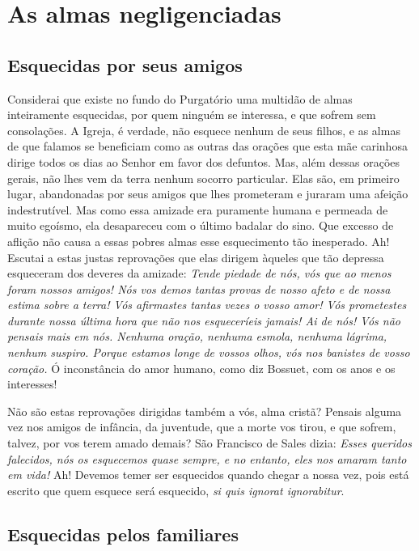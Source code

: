 \renewcommand{\thechapterdisplay}{Décimo terceiro dia}
\renewcommand{\thechapterrunner}{As almas negligenciadas}
\chapter[Décimo terceiro dia --- As almas negligenciadas]{As almas negligenciadas}
\section*{Esquecidas por seus amigos}

Considerai que existe no fundo do Purgatório uma multidão de almas inteiramente esquecidas, por quem ninguém se interessa, e que sofrem sem consolações. A Igreja, é verdade, não esquece nenhum de seus filhos, e as almas de que falamos se beneficiam como as outras das orações que esta mãe carinhosa dirige todos os dias ao Senhor em favor dos defuntos. Mas, além dessas orações gerais, não lhes vem da terra nenhum socorro particular. Elas são, em primeiro lugar, abandonadas por seus amigos que lhes prometeram e juraram uma afeição indestrutível. Mas como essa amizade era puramente humana e permeada de muito egoísmo, ela desapareceu com o último badalar do sino. Que excesso de aflição não causa a essas pobres almas esse esquecimento tão inesperado. Ah! Escutai a estas justas reprovações que elas dirigem àqueles que tão depressa esqueceram dos deveres da amizade: \textit{Tende piedade de nós, vós que ao menos foram nossos amigos! Nós vos demos tantas provas de nosso afeto e de nossa estima sobre a terra! Vós afirmastes tantas vezes o vosso amor! Vós prometestes durante nossa última hora que não nos esqueceríeis jamais! Ai de nós! Vós não pensais mais em nós. Nenhuma oração, nenhuma esmola, nenhuma lágrima, nenhum suspiro. Porque estamos longe de vossos olhos, vós nos banistes de vosso coração.} Ó inconstância do amor humano, como diz Bossuet, com os anos e os interesses!

Não são estas reprovações dirigidas também a vós, alma cristã? Pensais alguma vez nos amigos de infância, da juventude, que a morte vos tirou, e que sofrem, talvez, por vos terem amado demais? São Francisco de Sales dizia: \textit{Esses queridos falecidos, nós os esquecemos quase sempre, e no entanto, eles nos amaram tanto em vida!} Ah! Devemos temer ser esquecidos quando chegar a nossa vez, pois está escrito que quem esquece será esquecido, \textit{si quis ignorat ignorabitur}.


\section*{Esquecidas pelos familiares}

